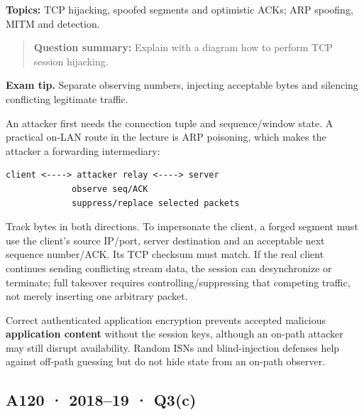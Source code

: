 \documentclass[11pt,a4paper]{article}
\begin{document}
\textbf{Topics:} TCP hijacking,\allowbreak{} spoofed segments and optimistic ACKs; ARP spoofing,\allowbreak{} MITM and detection.



\begin{quote}\small

\textbf{Question summary:} Explain with a diagram how to perform TCP session hijacking.



\end{quote}


{\color{ForestGreen}\textbf{Exam tip.} Separate observing numbers,\allowbreak{} injecting acceptable bytes and silencing conflicting legitimate traffic.}


An attacker first needs the connection tuple and sequence/\allowbreak{}window state. A practical on-LAN route in the lecture is ARP poisoning,\allowbreak{} which makes the attacker a forwarding intermediary:



\begin{Verbatim}[breaklines=true,breakanywhere=true,fontsize=\small,frame=single,rulecolor=\color{PanelBorder}]
client <----> attacker relay <----> server
             observe seq/ACK
             suppress/replace selected packets
\end{Verbatim}

Track bytes in both directions. To impersonate the client,\allowbreak{} a forged segment must use the client's source IP/\allowbreak{}port,\allowbreak{} server destination and an acceptable next sequence number/\allowbreak{}ACK. Its TCP checksum must match. If the real client continues sending conflicting stream data,\allowbreak{} the session can desynchronize or terminate; full takeover requires controlling/\allowbreak{}suppressing that competing traffic,\allowbreak{} not merely inserting one arbitrary packet.


Correct authenticated application encryption prevents accepted malicious \textbf{application content} without the session keys,\allowbreak{} although an on-path attacker may still disrupt availability. Random ISNs and blind-injection defenses help against off-path guessing but do not hide state from an on-path observer.




\clearpage
\subsection{A120 · 2018–19 · Q3(c)}\label{a120}
\end{document}
